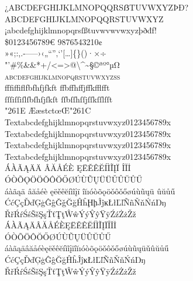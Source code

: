 \documentclass[pagesize,DIV14]{scrartcl}
\begin{document}
\begin{center}{
¿ABCDEFGHIJKLMNOPQQRSẞTUVWXYZÞÐ?\\
{ABCDEFGHIJKLMNOPQQRSTUVWXYZ}
¡abcdefghijklmnopqrsſßtuvw{vw}{vw}xyzþðđf!\\
\$0123456789€  {9876543210}¢\\
»«;:,.-–—›‹„“”‚‘’[…]\{\}()·×÷\\
"'\#\%\&{\&}*+/<=>@\textbackslash \textasciicircum \textasciitilde §©ªº°µΩ\\
\textsc{abcdefghijklmnopqrstuvwxyzß}\\ 
fffiffiflfbfhfjfkft%
ffbffhffjffkfflfft\\
ſſſiſſiſlſbſhſjſkſt%
ſſbſſhſſjſſkſſlſſt\\
\char"261E ÆæstctœŒ\char"261C\\
{
Text{abcdefghijklmnopqrstuvwxyz0123456789}x\\
Text{abcdefghijklmnopqrstuvwxyz0123456789}x\\
Text{abcdefghijklmnopqrstuvwxyz0123456789}x\\
Text{abcdefghijklmnopqrstuvwxyz0123456789}x}\\
ÁÀÃĄÄ{Ä}%
ÂĂÅÉÈ%
ĘËĚÊĔÍÌĨĮÏ%
ÎĬİ\\
ÓÒÕǪÖ{Ö}ǑÔŎŐØÚÙŨŲÜ{Ü}ǓÛŬŮŰ\\
áàãąä%
âăåéè%
ęëěêĕíìĩįï%
îĭıóòõǫöǒôǒőøúùũųü%
ûŭůű\\
ĆćÇçĎďĢģĜĝǦǧĞğĤĥḨḩĴĵĸŁłĽľÑñŇňŃńŊŋ\\
ŘřŔŕŚśŠšŞşŤťŢţŴŵÝýŶŷŸÿŹźŻżŽž\\
{ÁÀÃĄÄÂĂÅÉÈĘËĚÊĔÍÌĨĮÏÎĬİ\\
ÓÒÕÖÔŎŐØÚÙŨŲÜÛŬŮŰ\\
áàãąäâăåéèęëěêĕíìĩįïîĭıóòõ{ǫ}ö{ǒ}ôǒőøúùũųü{ǔ}ûŭůű\\
ĆćÇçĎďĢģĜĝĞğĤĥĴĵĸŁłĽľÑñŇňŃńŊŋ\\
ŘřŔŕŚśŠšŞşŤťŢţŴŵÝýŶŷŸÿŹźŻżŽž}\\
}
\end{center}
\end{document}
